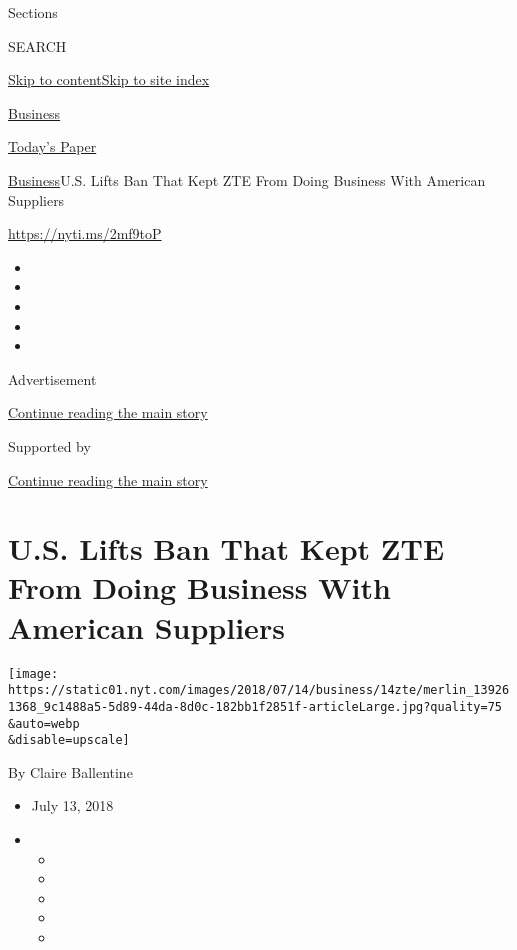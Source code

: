 Sections

SEARCH

\protect\hyperlink{site-content}{Skip to
content}\protect\hyperlink{site-index}{Skip to site index}

\href{https://www.nytimes.com/section/business}{Business}

\href{https://myaccount.nytimes.com/auth/login?response_type=cookie\&client_id=vi}{}

\href{https://www.nytimes.com/section/todayspaper}{Today's Paper}

\href{/section/business}{Business}\textbar{}U.S. Lifts Ban That Kept ZTE
From Doing Business With American Suppliers

\url{https://nyti.ms/2mf9toP}

\begin{itemize}
\item
\item
\item
\item
\item
\end{itemize}

Advertisement

\protect\hyperlink{after-top}{Continue reading the main story}

Supported by

\protect\hyperlink{after-sponsor}{Continue reading the main story}

\hypertarget{us-lifts-ban-that-kept-zte-from-doing-business-with-american-suppliers}{%
\section{U.S. Lifts Ban That Kept ZTE From Doing Business With American
Suppliers}\label{us-lifts-ban-that-kept-zte-from-doing-business-with-american-suppliers}}

\texttt{[image: https://static01.nyt.com/images/2018/07/14/business/14zte/merlin\_139261368\_9c1488a5-5d89-44da-8d0c-182bb1f2851f-articleLarge.jpg?quality=75\\\&auto=webp\\\&disable=upscale]}

By Claire Ballentine

\begin{itemize}
\item
  July 13, 2018
\item
  \begin{itemize}
  \item
  \item
  \item
  \item
  \item
  \end{itemize}
\end{itemize}

